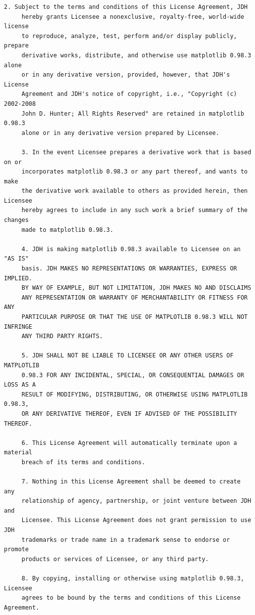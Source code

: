 \begin{lstlisting}[basicstyle=\ttfamily\footnotesize,breaklines=true]
     2. Subject to the terms and conditions of this License Agreement, JDH
     hereby grants Licensee a nonexclusive, royalty-free, world-wide license
     to reproduce, analyze, test, perform and/or display publicly, prepare
     derivative works, distribute, and otherwise use matplotlib 0.98.3 alone
     or in any derivative version, provided, however, that JDH's License
     Agreement and JDH's notice of copyright, i.e., "Copyright (c) 2002-2008
     John D. Hunter; All Rights Reserved" are retained in matplotlib 0.98.3
     alone or in any derivative version prepared by Licensee.

     3. In the event Licensee prepares a derivative work that is based on or
     incorporates matplotlib 0.98.3 or any part thereof, and wants to make
     the derivative work available to others as provided herein, then Licensee
     hereby agrees to include in any such work a brief summary of the changes
     made to matplotlib 0.98.3.

     4. JDH is making matplotlib 0.98.3 available to Licensee on an "AS IS"
     basis. JDH MAKES NO REPRESENTATIONS OR WARRANTIES, EXPRESS OR IMPLIED.
     BY WAY OF EXAMPLE, BUT NOT LIMITATION, JDH MAKES NO AND DISCLAIMS
     ANY REPRESENTATION OR WARRANTY OF MERCHANTABILITY OR FITNESS FOR ANY
     PARTICULAR PURPOSE OR THAT THE USE OF MATPLOTLIB 0.98.3 WILL NOT INFRINGE
     ANY THIRD PARTY RIGHTS.

     5. JDH SHALL NOT BE LIABLE TO LICENSEE OR ANY OTHER USERS OF MATPLOTLIB
     0.98.3 FOR ANY INCIDENTAL, SPECIAL, OR CONSEQUENTIAL DAMAGES OR LOSS AS A
     RESULT OF MODIFYING, DISTRIBUTING, OR OTHERWISE USING MATPLOTLIB 0.98.3,
     OR ANY DERIVATIVE THEREOF, EVEN IF ADVISED OF THE POSSIBILITY THEREOF.

     6. This License Agreement will automatically terminate upon a material
     breach of its terms and conditions.

     7. Nothing in this License Agreement shall be deemed to create any
     relationship of agency, partnership, or joint venture between JDH and
     Licensee. This License Agreement does not grant permission to use JDH
     trademarks or trade name in a trademark sense to endorse or promote
     products or services of Licensee, or any third party.

     8. By copying, installing or otherwise using matplotlib 0.98.3, Licensee
     agrees to be bound by the terms and conditions of this License Agreement.





\end{lstlisting}
